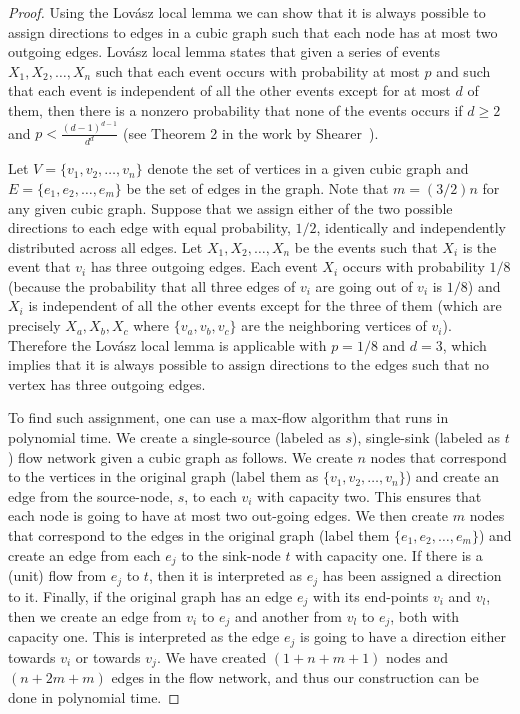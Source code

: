 \begin{proof}
Using the Lov{\'a}sz local lemma we can show that it is always possible to assign directions to edges in a cubic graph such that each node has at most two outgoing edges. Lov{\'a}sz local lemma states that given a series of events $X_1, X_2, \dots, X_n$ such that each event occurs with probability at most $p$ and such that each event is independent of all the other events except for at most $d$ of them, then there is a nonzero probability that none of the events occurs if $d \geq 2$ and $p < \frac{(d-1)^{d-1}}{d^d}$ (see Theorem 2 in the work by Shearer~\cite{lovasz_local_lemma}).

		Let $V = \{v_1, v_2, \dots, v_n\}$ denote the set of vertices in a given cubic graph and $E = \{e_1, e_2, \dots, e_m\}$ be the set of edges in the graph. Note that $m = (3/2)n$ for any given cubic graph. Suppose that we assign either of the two possible directions to each edge with equal probability, $1/2$, identically and independently distributed across all edges. 
		Let $X_1, X_2, \dots, X_n$ be the events such that $X_i$ is the event that $v_i$ has three outgoing edges.
		Each event $X_i$ occurs with probability $1/8$ (because the probability that all three edges of $v_i$ are going out of $v_i$ is $1/8$) and $X_i$ is independent of all the other events except for the three of them (which are precisely $X_a, X_b, X_c$ where $\{v_a,v_b,v_c\}$ are the neighboring vertices of $v_i$). Therefore the Lov{\'a}sz local lemma is applicable with $p = 1/8$ and $d = 3$, which implies that it is always possible to assign directions to the edges such that no vertex has three outgoing edges. 

		To find such assignment, one can use a max-flow algorithm that runs in polynomial time. We create a single-source (labeled as $s$), single-sink (labeled as $t$) flow network given a cubic graph as follows. We create $n$ nodes that correspond to the vertices in the original graph (label them as $\{v_1, v_2, \dots, v_n\}$) and create an edge from the source-node, $s$, to each $v_i$ with capacity two. This ensures that each node is going to have at most two out-going edges.
		We then create $m$ nodes that correspond to the edges in the original graph (label them $\{e_1, e_2, \dots, e_m\}$) and create an edge from each $e_j$ to the sink-node $t$ with capacity one. If there is a (unit) flow from $e_j$ to $t$, then it is interpreted as $e_j$ has been assigned a direction to it.  
	Finally, if the original graph has an edge $e_j$ with its end-points $v_i$ and $v_l$, then we create an edge from $v_i$ to $e_j$ and another from $v_l$ to $e_j$, both with capacity one. This is interpreted as the edge $e_j$ is going to have a direction either towards $v_i$ or towards $v_j$. 
	We have created $(1 + n + m + 1)$ nodes and $(n + 2m + m)$ edges in the flow network, and thus our construction can be done in polynomial time.  


\end{proof}
